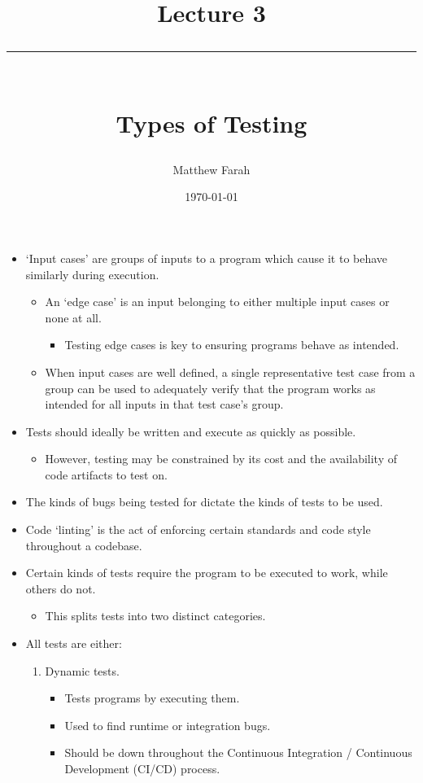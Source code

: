 \documentclass{article}
\date{
	\vspace{-.75em}
	{\large \today}
}
\title{
	\vspace*{-1.5em}
	{\Huge Lecture 3} \\
	\vspace{-1em}
	\rule{\textwidth/4}{.01em} \\
	\vspace{-.25em}
	{\Large Types of Testing}
	\vspace{-.75em}
}
\author{
	{\large Matthew Farah}
}
\begin{document}
\maketitle
\pagestyle{fancy}

\fi

\begin{itemize}
	\item `Input cases' are groups of inputs to a program which cause it to behave similarly during execution.
	\begin{itemize}
		\item An `edge case' is an input belonging to either multiple input cases or none at all.
		\begin{itemize}
			\item Testing edge cases is key to ensuring programs behave as intended.
		\end{itemize}
		\item When input cases are well defined, a single representative test case from a group can be used to adequately verify that the program works as intended for all inputs in that test case's group.
	\end{itemize}
	\item Tests should ideally be written and execute as quickly as possible.
	\begin{itemize}
		\item However, testing may be constrained by its cost and the availability of code artifacts to test on.
	\end{itemize}
	\item The kinds of bugs being tested for dictate the kinds of tests to be used.
	\item Code `linting' is the act of enforcing certain standards and code style throughout a codebase.
	\item Certain kinds of tests require the program to be executed to work, while others do not.
	\begin{itemize}
		\item This splits tests into two distinct categories.
	\end{itemize}
	\item All tests are either:
	\begin{enumerate}
		\item Dynamic tests.
		\begin{itemize}
			\item Tests programs by executing them.
			\item Used to find runtime or integration bugs.
			\item Should be down throughout the Continuous Integration / Continuous Development (CI/CD) process.

\end{itemize}
\end{enumerate}
\end{itemize}
\end{document}
